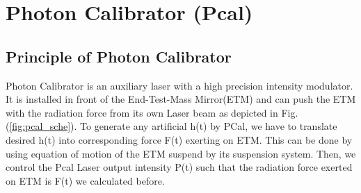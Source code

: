 


%
%
%
%
%
%


\section{Photon Calibrator (Pcal)}
\subsection{Principle of Photon Calibrator}
\label{sec:pcalth}
Photon Calibrator is an auxiliary laser with a high precision intensity modulator. It is installed in front of the End-Test-Mass Mirror(ETM) and can push the ETM with the radiation force from its own Laser beam as depicted in Fig.(\ref{fig:pcal_sche}). To generate any artificial h(t) by PCal, we have to translate desired h(t) into corresponding force F(t) exerting on ETM. This can be done by using equation of motion of the ETM suspend by its suspension system. Then, we control the Pcal Laser output intensity P(t) such that the radiation force exerted on ETM is F(t) we calculated before. 

